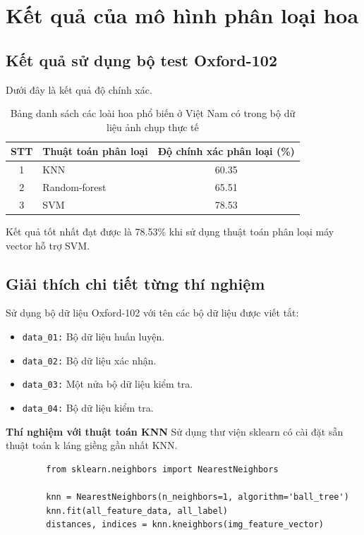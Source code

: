 \documentclass[12pt]{report}
\begin{document}
		\section{Kết quả của mô hình phân loại hoa}
		\subsection{Kết quả sử dụng bộ test Oxford-102}
		Dưới đây là kết quả độ chính xác.

		\begin{table}[h]
			\centering
			\caption{Bảng danh sách các loài hoa phổ biến ở Việt Nam có trong bộ dữ liệu ảnh chụp thực tế}
			\label{tbl:table ket qua cua Nilsback08}
			\begin{tabular}{|c|l|c|}
				\hline
				\textbf{STT} & \textbf{Thuật toán phân loại}& \textbf{Độ chính xác phân loại (\%)} \\ \hline
				1   	& KNN 		& 60.35 \\ \hline
				2	& Random-forest	& 65.51\\ \hline
				3	& SVM		& 78.53\\ \hline
			\end{tabular}
		\end{table}
		Kết quả tốt nhất đạt được là 78.53\% khi sử dụng thuật toán phân loại máy vector hỗ trợ SVM.

		\subsection{Giải thích chi tiết từng thí nghiệm}
		Sử dụng bộ dữ liệu Oxford-102 với tên các bộ dữ liệu được viết tắt:
		\begin{itemize}
			\item \texttt{data\_01:} Bộ dữ liệu huấn luyện.
			\item \texttt{data\_02:} Bộ dữ liệu xác nhận.
			\item \texttt{data\_03:} Một nửa bộ dữ liệu kiểm tra.
			\item \texttt{data\_04:} Bộ dữ liệu kiểm tra.
		\end{itemize}

		\textbf{Thí nghiệm với thuật toán KNN}
		Sử dụng thư viện sklearn có cài đặt sẵn thuật toán k láng giềng gần nhất KNN.
		\begin{lstlisting}
		from sklearn.neighbors import NearestNeighbors

		knn = NearestNeighbors(n_neighbors=1, algorithm='ball_tree')
		knn.fit(all_feature_data, all_label)
		distances, indices = knn.kneighbors(img_feature_vector)
		\end{lstlisting}
\end{document}
